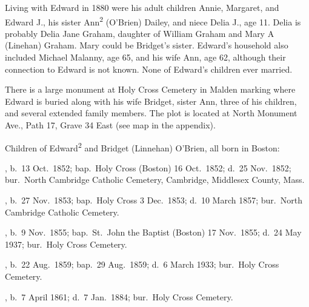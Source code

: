 Living with Edward in 1880 were his adult children Annie, Margaret, and Edward J., his sister Ann\textsuperscript{2} (O'Brien) Dailey, and niece Delia J., age 11.\cite{Census1880Edward} Delia is probably Delia Jane Graham, daughter of William Graham and Mary A (Linehan) Graham.\cite{DeliaGrahamBirth,MaryGrahamDeath} Mary could be Bridget's sister. Edward's household also included Michael Malanny, age 65, and his wife Ann, age 62, although their connection to Edward is not known.\cite{Census1880Edward} None of Edward's children ever married. 

There is a large monument at Holy Cross Cemetery in Malden marking where Edward is buried along with his wife Bridget, sister Ann, three of his children, and several extended family members. The plot is located at North Monument Ave., Path 17, Grave 34 East (see map in the appendix).\cite{Edward2OBrienGrave,CarolGordon}

\begin{KidsIntro}
	Children of Edward\textsuperscript{2} and Bridget (Linnehan) O'Brien, all born in Boston:
\end{KidsIntro}

\begin{Kids}
	, b.\ 13 Oct.\ 1852;\cite{MaryAnn3OBrienBirth} bap.\ Holy Cross (Boston) 16 Oct.\ 1852;\cite{MaryAnn3OBrienBaptism} d.\ 25 Nov.\ 1852;\cite{MaryAnn3OBrienDeath} bur.\ North Cambridge Catholic Cemetery, Cambridge, Middlesex County, Mass.\cite{DianaBerberenaLetter1}
	
	, b.\ 27 Nov.\ 1853;\cite{Ellen3OBrienBirth} bap.\ Holy Cross 3 Dec.\ 1853;\cite{Ellen3OBrienBaptism} d.\ 10 March 1857;\cite{Ellen3OBrienDeath} bur.\ North Cambridge Catholic Cemetery.\cite{DianaBerberenaLetter2}
	
	, b.\ 9 Nov.\ 1855;\cite{AnnMaria3OBrienBirth} bap.\ St.\ John the Baptist (Boston) 17 Nov.\ 1855\cite{AnnMaria3OBrienBaptism}; d.\ 24 May 1937;\cite{AnnMaria3OBrienDeath} bur.\ Holy Cross Cemetery.\cite{CarolGordon}
	
	, b.\ 22 Aug.\ 1859;\cite{Margaret3OBrienBaptism} bap.\ 29 Aug.\ 1859;\cite{Margaret3OBrienBaptism} d.\ 6 March 1933;\cite{Margaret3OBrienDeath} bur.\ Holy Cross Cemetery.\cite{CarolGordon}
	
	, b.\ 7 April 1861;\cite{Edward3OBrienBirth} d.\ 7 Jan.\ 1884;\cite{Edward3OBrienDeath} bur.\ Holy Cross Cemetery.\cite{CarolGordon}
\end{Kids}